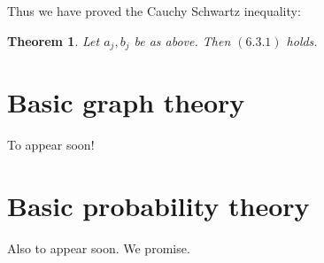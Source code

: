 \documentclass[]{amsart}
\numberwithin{equation}{section}
\theoremstyle{plain}
\newtheorem{theorem}{Theorem}[section]
\theoremstyle{definition}
\theoremstyle{remark}
\begin{document}
Thus we have proved the Cauchy Schwartz inequality:
\begin{theorem} Let $a_j, b_j$ be as above. Then $(6.3.1)$
holds. \end{theorem}



\section{Basic graph theory }

To appear soon!

\section{Basic probability theory  }

Also to appear soon.  We promise.
\end{document}
